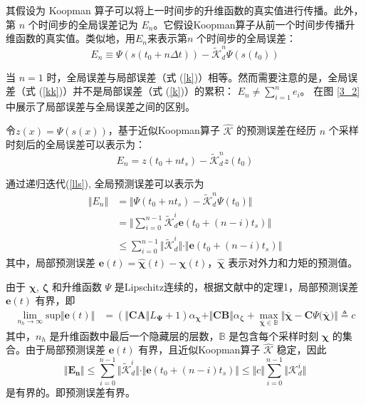 \documentclass[lang=chs, degree=master, blindreview=true, winfonts=true]{yanputhesis}
\begin{document}
其假设为 Koopman 算子可以将上一时间步的升维函数的真实值进行传播。此外，第 \( n \) 个时间步的全局误差记为 $E_n$。它假设Koopman算子从前一个时间步传播升维函数的真实值。类似地，用$E_n$来表示第\( n \) 个时间步的全局误差：	
\begin{equation}
	E_n\equiv\Psi(s(t_0+n\Delta t))-\tilde{\mathcal{K}}_d^n\Psi(s(t_0))
	\label{kk}
\end{equation}


当 \( n = 1 \) 时，全局误差与局部误差（式 (\ref{k})）相等。然而需要注意的是，全局误差（式 (\ref{kk})）并不是局部误差（式 (\ref{k})）的累积： 
$
E_n \neq \sum_{i=1}^n e_i
$。
在图 \ref{3_2} 中展示了局部误差与全局误差之间的区别。

	令$z(x)=\Psi(s(x))$，基于近似Koopman算子 $\hat{{\mathcal{K}}}$ 的预测误差在经历 $n$ 个采样时刻后的全局误差可以表示为：
	\begin{equation}
		{E}_n = {z}(t_0 + nt_s) - \tilde{\mathcal{K}}_d^n {z}(t_0)
	\end{equation}


	
	通过递归迭代(\ref{lls}), 全局预测误差可以表示为
	\begin{equation}
    	\begin{aligned}
		\Vert {E_n} \Vert &= \Vert {\Psi}(t_0+nt_s) -\tilde{\mathcal{K}}_d^n {\Psi}(t_0) \Vert  \\
		&=\Vert \sum_{i=0}^{n-1}\tilde{\mathcal{K}}_d^i\bm{e}(t_0+(n-i)t_s)\Vert \\
		&\le \sum_{i=0}^{n-1}\Vert \tilde{\mathcal{K}}_d^i\Vert \cdot \Vert \bm{e}(t_0+(n-i)t_s) \Vert
	\end{aligned}
	\end{equation}
	其中，局部预测误差 $\bm{e}(t)=\bm{\hat{\chi}}(t)-\bm{\chi}(t)$，$\bm{\hat{\chi}}$ 表示对外力和力矩的预测值。
	
	由于 $\bm{\chi}$, $\bm{\zeta}$ 和升维函数 ${\Psi}$ 是Lipschitz连续的，根据文献中的定理1，局部预测误差 $\bm{e}(t)$ 有界，即
	\begin{equation}
    	\begin{aligned}
		\lim_{n_h\rightarrow \infty} \text{sup} \Vert \bm{e}(t) \Vert &=(\Vert \bm{CA} \Vert L_{\bm{\Psi}}+1) \alpha_{\bm{\chi}}+\Vert \bm{CB}\Vert \alpha_{\bm{\zeta}} +\max_{\overline{\bm{\chi}}\in \mathbb{B}} \Vert \overline{\bm{\chi}} -\bm{C} \Psi\bm{(\overline{\bm{\chi}}}) \Vert \triangleq c
	\end{aligned}
	\end{equation}
	其中，$n_h$ 是升维函数中最后一个隐藏层的层数，$\mathbb{B}$ 是包含每个采样时刻 $\bm{\chi}$ 的集合。由于局部预测误差 $\bm{e}(t)$ 有界，且近似Koopman算子 $\hat{\bm{\mathcal{K}}}$ 稳定，因此
	\begin{equation}
    	\Vert \bm{E_n} \Vert \le \sum_{i=0}^{n-1}\Vert \tilde{\mathcal{K}}_d^i\Vert \cdot \Vert \bm{e}(t_0+(n-i)t_s) \Vert\le \Vert c \Vert \sum_{i=0}^{n-1}\Vert {\mathcal{K}}_d^i \Vert
	\end{equation}
	是有界的。即预测误差有界。
\end{document}
